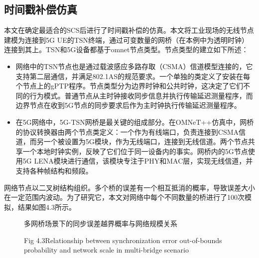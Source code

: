 \documentclass[UTF8,a4paper,12pt]{ctexart}
\numberwithin{equation}{section}
\begin{document}
	\subsection{时间戳补偿仿真}
	本文在确定最适合的SCS后进行了时间戳补偿的仿真。本文将工业现场的无线节点建模为连接到5G UE的TSN终端，通过可变数量的网桥（在本例中为透明时钟）连接到其上。TSN和5G设备都基于omnet节点类型。节点类型的建立如下所述：
	\begin{itemize}
		\item 网络中的TSN节点也是通过载波感应多路存取（CSMA）信道模型连接的，它支持第二层通信，并满足802.1AS的规范要求。一个单独的类定义了安装在每个节点上的gPTP程序。节点类型分为边界时钟和公共时钟，这决定了它们不同的行为模式。普通节点从主时钟接收同步信息并执行传输延迟测量程序，而边界节点在收到5G节点的同步要求后作为主时钟执行传输延迟测量程序。
		\item 在5G网络中，5G-TSN网桥是最关键的组成部分。在OMNeT++仿真中，网桥的协议转换器由两个节点类定义：一个作为有线端口，负责连接到CSMA信道，而另一个被设置为5G模块，作为无线端口，连接到无线信道。两个节点共享一个本地时钟实例，反映了它们位于同一设备内的事实。网桥内的5G节点使用5G LENA模块进行通信，该模块专注于PHY和MAC层，实现无线信道，并支持各种帧结构和频段。
	\end{itemize}
	网络节点以二叉树结构组织。多个桥的误差有一个相互抵消的概率，导致误差大小在一定范围内波动。为了研究它，本文对网络中每个不同数量的桥进行了100次模拟，结果如图4.3所示。
	\begin{figure}[htb] 
		\caption{多网桥场景下的同步误差越界概率与网络规模关系}
		\vspace{-10pt}
		\caption*{Fig 4.3\quad Relationship between synchronization error out-of-bounds probability and network scale in multi-bridge scenario} 
	\end{figure}
	
\end{document}
